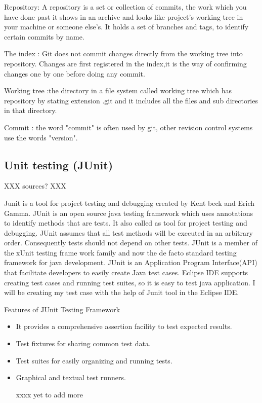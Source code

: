 \documentclass{article}
\begin{document}
Repository:  A repository is a set or collection of commits, the work which you have done past it shows in an archive and looks like project's working tree in your machine or someone else's. It holds a set of branches and tags, to identify certain commits by name.

The index : Git does not commit changes directly from the working tree into repository. Changes are first registered in the index,it is the way of confirming changes one by one before doing any commit.																										

Working tree :the directory in a file system called working tree which has repository by stating extension .git and it includes all the files and sub directories in that  directory.

Commit : the word "commit" is often used by git, other revision control systems use the words "version".


\subsection{Unit testing (JUnit)}
\label{sec:junit}

XXX sources? XXX

Junit is a tool for project testing and debugging created by Kent beck and Erich Gamma.
JUnit is an open source java testing framework which uses annotations to identify methods that are tests. It also called as tool for project testing and debugging. JUnit assumes that all test methods will be executed in an arbitrary order. Consequently tests should not depend on other tests.
JUnit is a member of the xUnit testing frame work family and now the de facto standard testing framework for java development. JUnit is an Application Program Interface(API) that facilitate developers to easily create Java test cases. 
Eclipse IDE supports creating test cases and running test suites, so it is easy to test java application.
I will be creating my test case with the help of Junit tool in the Eclipse IDE. 

Features of JUnit Testing Framework
\begin{itemize}

\item It provides a comprehensive assertion facility to test expected results.
\item Test fixtures for sharing common test data.
\item Test suites for easily organizing and running tests.
\item Graphical and textual test runners.

xxxx yet to add more 

\end{itemize}
\end{document}
